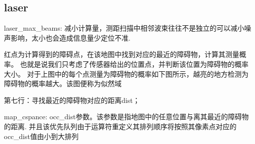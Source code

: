 \subsection{laser}

laser\_max\_beams: 减小计算量，测距扫描中相邻波束往往不是独立的可以减小噪声影响，太小也会造成信息量少定位不准.


红点为计算得到的障碍点，在该地图中找到对应的最近的障碍物，计算其测量概率。
也就是说我们只考虑了传感器给出的位置点，并判断该位置为障碍物的概率大小。
对于上图中的每个点测量为障碍物的概率如下图所示，越亮的地方检测为障碍物的概率越大。该图便称为似然域

第七行：寻找最近的障碍物对应的距离dist；

map\_cspance:
occ\_dist参数。该参数是指地图中的任意位置与离其最近的障碍物的距离.
并且该优先队列由于运算符重定义其排列顺序将按照其像素点对应的occ\_dist值由小到大排列